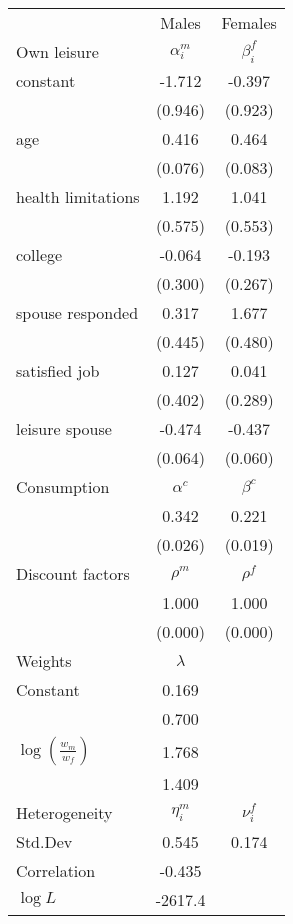 \begin{tabular}{lcc} 
\hline\hline 
 & Males & Females \\ 
Own leisure & $\alpha_{i}^{m}$ & $\beta_{i}^{f}$ \\ 
constant & -1.712 & -0.397 \\ 
 & (0.946) & (0.923) \\ 
age & 0.416 & 0.464 \\ 
 & (0.076) & (0.083) \\ 
health limitations & 1.192 & 1.041 \\ 
 & (0.575) & (0.553) \\ 
college & -0.064 & -0.193 \\ 
 & (0.300) & (0.267) \\ 
spouse responded & 0.317 & 1.677 \\ 
 & (0.445) & (0.480) \\ 
satisfied job & 0.127 & 0.041 \\ 
 & (0.402) & (0.289) \\ 
leisure spouse & -0.474 & -0.437 \\ 
 & (0.064) & (0.060) \\ 
Consumption & $\alpha^{c}$ & $\beta^{c}$ \\ 
 & 0.342 & 0.221 \\ 
 & (0.026) & (0.019) \\ 
Discount factors & $\rho^m$ & $\rho^f$ \\ 
 & 1.000 & 1.000 \\ 
 & (0.000) & (0.000) \\ 
Weights & $\lambda$ &  \\ 
Constant & 0.169 &  \\ 
 & 0.700 &  \\ 
$\log(\frac{w_m}{w_f})$ & 1.768 &  \\ 
 & 1.409 &  \\ 
Heterogeneity & $\eta_i^m$ & $\nu_i^f$ \\ 
Std.Dev & 0.545 & 0.174 \\ 
Correlation & -0.435 &  \\ 
\hline 
$\log L$ & -2617.4 & \\ 
\hline \hline 
\end{tabular} 
